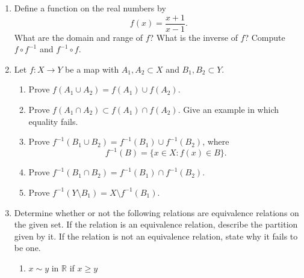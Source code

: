 {\begin{enumerate}
\begin{enumerate}
\item
If $g \circ f$ is one-to-one, show that $f$ is one-to-one.
 
\item
If $g \circ f$ is one-to-one and $f$ is onto, show that $g$ is
one-to-one.
 
\item
If $g \circ f$ is onto and $g$ is one-to-one, show that $f$ is onto.
 
\end{enumerate}
 
\item
Define a function on the real numbers by
$$
f(x) = \frac{x + 1}{x - 1}.
$$
What are the domain and range of $f$? What is the inverse of $f$?  Compute $f \circ f^{-1}$ and $f^{-1} \circ f$. 
 
\item
Let $f: X \rightarrow Y$ be a map with $A_1, A_2 \subset X$ and $B_1, B_2 \subset Y$. 
\begin{enumerate}
 
\item
Prove $f( A_1 \cup A_2 ) = f( A_1) \cup f( A_2 )$.
 
\item
Prove $f( A_1 \cap A_2 ) \subset f( A_1) \cap f( A_2 )$.  Give an example in which equality fails.
 
\item
Prove $f^{-1}( B_1 \cup B_2 ) = f^{-1}( B_1) \cup f^{-1}(B_2 )$, where
$$
f^{-1}(B) = \{ x \in X : f(x) \in B \}.
$$
 
\item
Prove $f^{-1}( B_1 \cap B_2 ) = f^{-1}( B_1) \cap f^{-1}( B_2 )$. 
 
\item
Prove $f^{-1}( Y \setminus B_1 ) = X \setminus f^{-1}( B_1)$.
 
\end{enumerate}
 
\item
Determine whether or not the following relations are equivalence relations on the given set.  If the relation is an equivalence relation, describe the partition given by it.  If the relation is not an equivalence relation, state why it fails to be one.
\begin{multicols}{2}
\begin{enumerate}
 
\item
$x \sim y$ in ${\mathbb R}$ if $x \geq y$
 

\end{enumerate}
\end{multicols}
\end{enumerate}}

